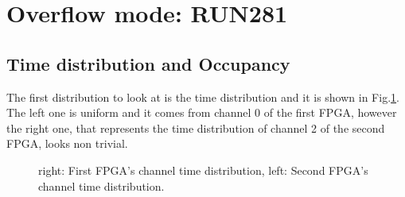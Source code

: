 
\section{Overflow mode: RUN281}
\subsection{Time distribution and Occupancy}\label{over}
The first distribution to look at is the time distribution and it is shown in Fig.\ref{fig:1}.
The left one is uniform and it comes from channel 0 of the first FPGA, however the right one, that represents the time distribution of channel 2 of the second FPGA, looks non trivial.

\begin{figure}[H]
  \hspace{-0.5in}
  \caption{
    \label{fig:1}
    right: First FPGA's channel time distribution, left: Second FPGA's channel time distribution.
  }
\end{figure}

